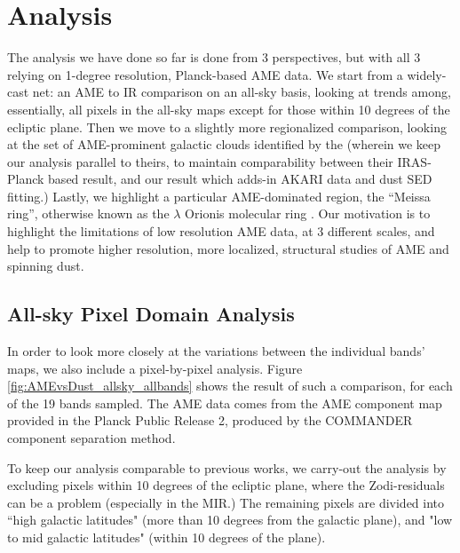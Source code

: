 \documentclass[preprint2,longabstract]{aastex}
\begin{document}
\section{Analysis}
\label{sec:analysis}

The analysis we have done so far is done from 3 perspectives, but with all 3 relying on 1-degree resolution, Planck-based AME data. We start from a widely-cast net: an AME to IR comparison on an all-sky basis, looking at trends among, essentially, all pixels in the all-sky maps except for those within 10 degrees of the ecliptic plane. Then we move to a slightly more regionalized comparison, looking at the set of AME-prominent galactic clouds identified by the \cite{planckXV} (wherein we keep our analysis parallel to theirs, to maintain comparability between their IRAS-Planck based result, and our result which adds-in AKARI data and dust SED fitting.) Lastly, we highlight a particular AME-dominated region, the ``Meissa ring'', otherwise known as the $\lambda$ Orionis molecular ring \citep{maddalena86,maddalena87}. Our motivation is to highlight the limitations of low resolution AME data, at 3 different scales, and help to promote higher resolution, more localized, structural studies of AME and spinning dust.

\subsection{All-sky Pixel Domain Analysis}

	In order to look more closely at the variations between the individual bands' maps, we also include a pixel-by-pixel analysis. Figure \ref{fig:AMEvsDust_allsky_allbands} shows the result of such a comparison, for each of the 19 bands sampled. The AME data comes from the AME component map provided in the Planck Public Release 2, produced by the COMMANDER component separation method.

    To keep our analysis comparable to previous works, we carry-out the analysis by excluding pixels within 10 degrees of the ecliptic plane, where the Zodi-residuals can be a problem (especially in the MIR.) The remaining pixels are divided into ``high galactic latitudes" (more than 10 degrees from the galactic plane), and "low to mid galactic latitudes" (within 10 degrees of the plane).
\end{document}
